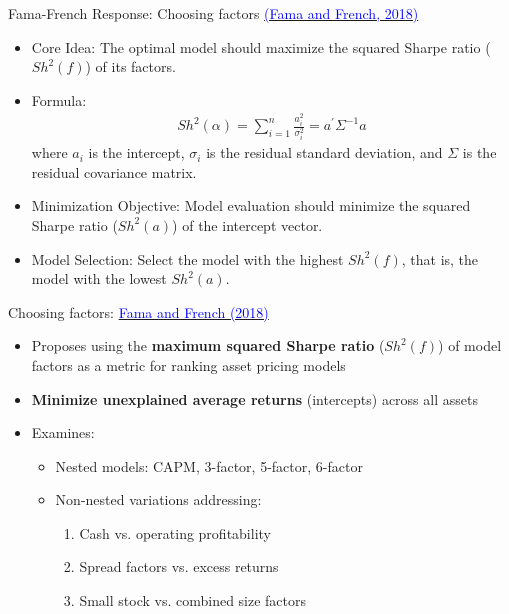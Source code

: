 \documentclass{beamer}
\begin{document}
\begin{frame}{Fama-French Response: Choosing factors \href{https://doi.org/10.1016/j.jfineco.2018.02.012}{\textcolor{blue}{(Fama and French, 2018)}}}

    \begin{itemize}
        \item Core Idea: The optimal model should maximize the squared Sharpe ratio ($Sh^{2}(f)$) of its factors.
        \item Formula:
        \begin{align*}
        Sh^{2}(\alpha) = \sum_{i = 1}^{n}\frac{a_{i}^{2}}{\sigma_{i}^{2}} = a^{\prime}\Sigma^{-1}a
        \end{align*}
        where $a_{i}$ is the intercept, $\sigma_{i}$ is the residual standard deviation, and $\Sigma$ is the residual covariance matrix.
        \item Minimization Objective: Model evaluation should minimize the squared Sharpe ratio ($Sh^{2}(a)$) of the intercept vector.
        \item Model Selection: Select the model with the highest $Sh^{2}(f)$, that is, the model with the lowest $Sh^{2}(a)$.
    \end{itemize}
\end{frame}


\begin{frame}{Choosing factors: \href{https://doi.org/10.1016/j.jfineco.2018.02.012}{\textcolor{blue}{Fama and French (2018)}}}
    \begin{itemize}
\item Proposes using the \textbf{maximum squared Sharpe ratio} ($Sh^2(f)$) of model factors as a metric for ranking asset pricing models
\item \textbf{Minimize unexplained average returns} (intercepts) across all assets
\item Examines:
\begin{itemize}
\item Nested models: CAPM, 3-factor, 5-factor, 6-factor
\item Non-nested variations addressing:
\begin{enumerate}
\item Cash vs. operating profitability
\item Spread factors vs. excess returns
\item Small stock vs. combined size factors
\end{enumerate}
\end{itemize}
\end{itemize}
\end{frame}
\end{document}
